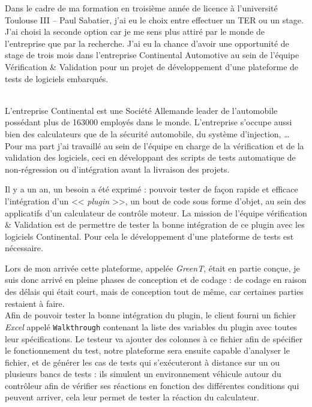 \documentclass[a4paper, 12pt]{article}
\begin{document}
	\maketitle
	Dans le cadre de ma formation en troisième année de licence à l'université Toulouse III -- Paul Sabatier, j'ai eu le choix entre effectuer un TER ou un
	stage.  J'ai choisi la seconde option car je me sens plus attiré par le monde de l'entreprise que par la recherche. J'ai eu la chance d’avoir une opportunité de stage de trois mois dans l'entreprise Continental Automotive au sein de l'équipe Vérification \& Validation pour un projet de développement
	d'une plateforme de tests de logiciels embarqués.\\~

	L'entreprise Continental est une Société Allemande leader de l'automobile possédant plus de 163000 employés dans le monde. L'entreprise s'occupe aussi bien des calculateurs que de la sécurité automobile, du système d'injection, \ldots \\
	Pour ma part j'ai travaillé au
	sein de l'équipe en charge de la vérification et de la validation des logiciels, ceci en développant des scripts de tests automatique de non-régression ou d'intégration avant la
	livraison des projets.

	Il y a un an, un besoin a été exprimé : pouvoir tester de façon rapide et efficace l'intégration d'un << \textit{plugin} >>, un bout de code sous forme
	d'objet,  au sein des applicatifs d'un calculateur de contrôle moteur. La mission de l'équipe vérification \& Validation est de permettre de tester la bonne intégration
	de ce plugin avec les logiciels Continental. Pour cela le développement d'une plateforme de tests est nécessaire.

	Lors de mon arrivée cette plateforme, appelée \textit{GreenT}, était en partie conçue, je suis donc arrivé en pleine phases de conception et de codage : de
	codage en raison des délais qui était court, mais de conception tout de même, car certaines parties restaient à faire.\\
	Afin de pouvoir tester la bonne intégration du plugin, le client fourni un fichier \textit{Excel} appelé \texttt{Walkthrough} contenant la liste des variables du plugin avec
toutes leur spécifications. Le testeur va ajouter des colonnes à ce fichier afin de spécifier le fonctionnement du test, notre plateforme sera ensuite
	capable d'analyser le fichier, et de générer les cas de tests qui s'exécuteront à distance sur un ou plusieurs bancs de tests : 
		ils simulent un environnement véhicule autour du
	contrôleur afin de vérifier ses réactions en fonction des différentes conditions qui peuvent arriver, cela leur permet de tester la réaction du calculateur.
\end{document}
